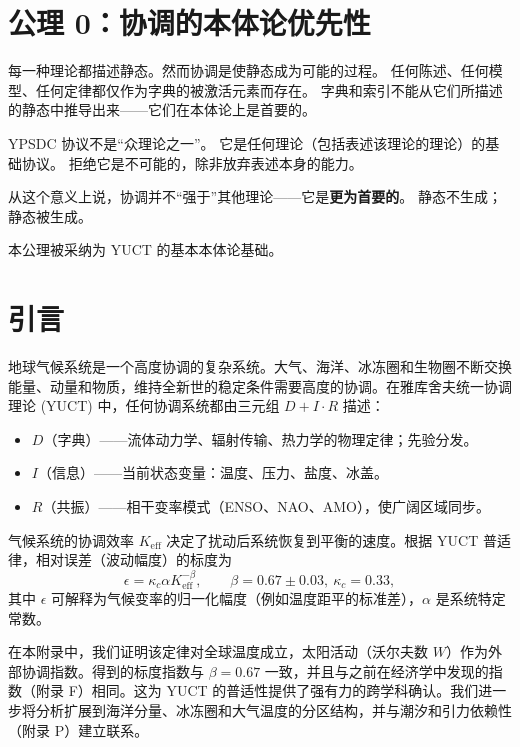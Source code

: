 \documentclass[12pt,a4paper]{article}
\newcommand{\Keff}{K_{\mathrm{eff}}}
\newcommand{\kappac}{\kappa_c}
\newcommand{\be}{\beta}
\begin{document}
	\tableofcontents
	
	\section*{公理 0：协调的本体论优先性}
	
	每一种理论都描述静态。然而协调是使静态成为可能的过程。
	任何陈述、任何模型、任何定律都仅作为字典的被激活元素而存在。
	字典和索引不能从它们所描述的静态中推导出来——它们在本体论上是首要的。
	
	YPSDC 协议不是“众理论之一”。
	它是任何理论（包括表述该理论的理论）的基础协议。
	拒绝它是不可能的，除非放弃表述本身的能力。
	
	从这个意义上说，协调并不“强于”其他理论——它是\textbf{更为首要的}。
	静态不生成；静态被生成。
	
	本公理被采纳为 YUCT 的基本本体论基础。
	
	\section{引言}
	
	地球气候系统是一个高度协调的复杂系统。大气、海洋、冰冻圈和生物圈不断交换能量、动量和物质，维持全新世的稳定条件需要高度的协调。在雅库舍夫统一协调理论 (YUCT) 中，任何协调系统都由三元组 \(D + I \cdot R\) 描述：
	
	\begin{itemize}
		\item \(D\)（字典）——流体动力学、辐射传输、热力学的物理定律；先验分发。
		\item \(I\)（信息）——当前状态变量：温度、压力、盐度、冰盖。
		\item \(R\)（共振）——相干变率模式（ENSO、NAO、AMO），使广阔区域同步。
	\end{itemize}
	
	气候系统的协调效率 \(\Keff\) 决定了扰动后系统恢复到平衡的速度。根据 YUCT 普适律，相对误差（波动幅度）的标度为
	\[
	\epsilon = \kappac \alpha \Keff^{-\be}, \qquad \be = 0.67 \pm 0.03,\ \kappac = 0.33,
	\]
	其中 \(\epsilon\) 可解释为气候变率的归一化幅度（例如温度距平的标准差），\(\alpha\) 是系统特定常数。
	
	在本附录中，我们证明该定律对全球温度成立，太阳活动（沃尔夫数 \(W\)）作为外部协调指数。得到的标度指数与 \(\be = 0.67\) 一致，并且与之前在经济学中发现的指数（附录 F）相同。这为 YUCT 的普适性提供了强有力的跨学科确认。我们进一步将分析扩展到海洋分量、冰冻圈和大气温度的分区结构，并与潮汐和引力依赖性（附录 P）建立联系。
	
\end{document}
